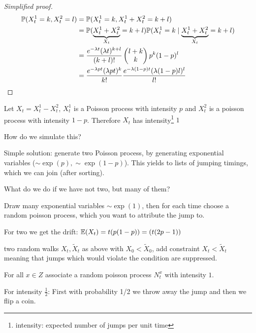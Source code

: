 \begin{proof}[Simplified proof]
    \begin{align*}
        \mathbb{P}(X_t^1=k,X_t^2=l)&=\mathbb{P}(X_t^1=k,X_t^1+X_t^2=k+l)\\
        &=\mathbb{P}(\underbrace{X_t^1+ X_t^2}_{X_t}=k+l)\mathbb{P}(X_t^1=k\mid \underbrace{X_t^1+ X_t^2}_{X_t}=k+l)\\
        &=\frac{e^{-\lambda t}(\lambda t)^{k+l}}{(k+l)!}\begin{pmatrix}
            l+k\\k
        \end{pmatrix}p^k (1-p)^l\\
        &=\frac{e^{-\lambda p t}(\lambda p t)^k}{k!}\frac{e^{-\lambda(1-p)t}(\lambda (1-p)l)^l}{l!}\qedhere
    \end{align*}
\end{proof}

\begin{aremark}
    Let $X_t=X_t^1-X_t^2$, $X_t^1$ is a Poisson process with intensity $p$ and $X_t^2$ is a poisson process with intensity $1-p$. Therefore 
    $X_t$ has intensity\footnote{intensity: expected number of jumps per unit time} $1$    
\end{aremark}

How do we simulate this?

Simple solution: generate two Poisson process, by generating exponential variables ($\sim \exp(p),\sim\exp(1-p)$). This yields to lists of jumping timings, which we can join (after sorting).

What do we do if we have not two, but many of them?

Draw many exponential variables $\sim\exp(1)$, then for each time choose a random poisson process, which you want to attribute the jump to.

For two we get the drift: $\mathbb{E}(X_t)=t(p(1-p))=(t(2p-1))$

two random walks $X_t, \tilde{X}_t$ as above with $X_0<\tilde{X}_0$, add constraint $X_t<\tilde{X}_t$ meaning that jumps which would violate the condition are suppressed.

For all $x\in Z$ associate a random poisson process $N_t^x$ with intensity $1$.

For intensity $\frac{1}{2}$: First with probability 1/2 we throw away the jump and then we flip a coin.

